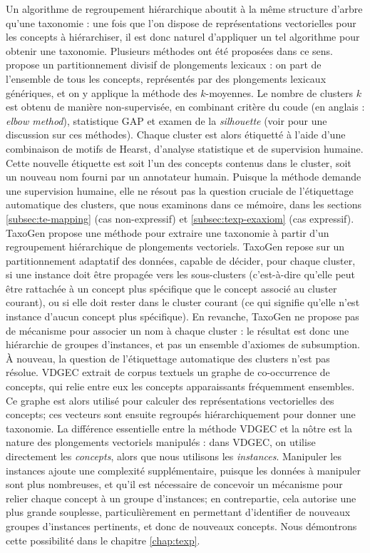 Un algorithme de regroupement hiérarchique aboutit à la même structure d'arbre qu'une taxonomie : une fois que l'on dispose de représentations vectorielles pour les concepts à hiérarchiser, il est donc naturel d'appliquer un tel algorithme pour obtenir une taxonomie. Plusieurs méthodes ont été proposées dans ce sens. \cite{gupta2016domain} propose un partitionnement divisif de plongements lexicaux : on part de l'ensemble de tous les concepts, représentés par des plongements lexicaux génériques, et on y applique la méthode des $k$-moyennes. Le nombre de clusters $k$ est obtenu de manière non-supervisée, en combinant critère du coude (en anglais : \textit{elbow method}), statistique GAP et examen de la \textit{silhouette} (voir \cite[p.~126--130]{everitt2011cluster} pour une discussion sur ces méthodes). Chaque cluster est alors étiquetté à l'aide d'une combinaison de motifs de Hearst, d'analyse statistique et de supervision humaine. Cette nouvelle étiquette est soit l'un des concepts contenus dans le cluster, soit un nouveau nom fourni par un annotateur humain. Puisque la méthode demande une supervision humaine, elle ne résout pas la question cruciale de l'étiquettage automatique des clusters, que nous examinons dans ce mémoire, dans les sections \ref{subsec:te-mapping} (cas non-expressif) et \ref{subsec:texp-exaxiom} (cas expressif). TaxoGen \cite{zhang2018taxogen} propose une méthode pour extraire une taxonomie à partir d'un regroupement hiérarchique de plongements vectoriels. TaxoGen repose sur un partitionnement adaptatif des données, capable de décider, pour chaque cluster, si une instance doit être propagée vers les sous-clusters (c'est-à-dire qu'elle peut être rattachée à un concept plus spécifique que le concept associé au cluster courant), ou si elle doit rester dans le cluster courant (ce qui signifie qu'elle n'est instance d'aucun concept plus spécifique). En revanche, TaxoGen ne propose pas de mécanisme pour associer un nom à chaque cluster : le résultat est donc une hiérarchie de groupes d'instances, et pas un ensemble d'axiomes de subsumption. À nouveau, la question de l'étiquettage automatique des clusters n'est pas résolue.
VDGEC \cite{zhang2018variational2} extrait de corpus textuels un graphe de co-occurrence de concepts, qui relie entre eux les concepts apparaissants fréquemment ensembles. Ce graphe est alors utilisé pour calculer des représentations vectorielles des concepts; ces vecteurs sont ensuite regroupés hiérarchiquement pour donner une taxonomie. La différence essentielle entre la méthode VDGEC et la nôtre est la nature des plongements vectoriels manipulés : dans VDGEC, on utilise directement les \textit{concepts}, alors que nous utilisons les \textit{instances}. Manipuler les instances ajoute une complexité supplémentaire, puisque les données à manipuler sont plus nombreuses, et qu'il est nécessaire de concevoir un mécanisme pour relier chaque concept à un groupe d'instances; en contrepartie, cela autorise une plus grande souplesse, particulièrement en permettant d'identifier de nouveaux groupes d'instances pertinents, et donc de nouveaux concepts. Nous démontrons cette possibilité dans le chapitre \ref{chap:texp}.


